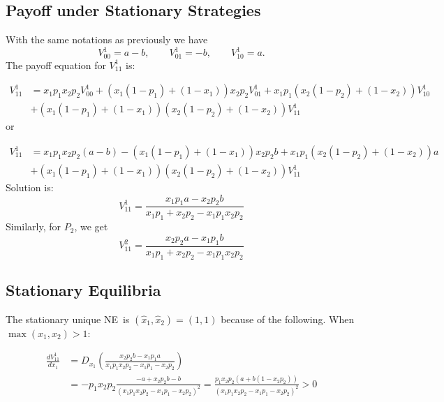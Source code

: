 \documentclass{article}%
\numberwithin{equation}{section}
\begin{document}
\subsection{Payoff under Stationary Strategies}

With the same notations as previously we have%
\[
V_{00}^{1}=a-b,\qquad V_{01}^{1}=-b,\qquad V_{10}^{1}=a.
\]
The payoff equation for $V_{11}^{1}$ is:%

\begin{align*}
V_{11}^{1}  &  =x_{1}p_{1}x_{2}p_{2}V_{00}^{1}+\left(  x_{1}\left(
1-p_{1}\right)  +\left(  1-x_{1}\right)  \right)  x_{2}p_{2}V_{01}^{1}%
+x_{1}p_{1}\left(  x_{2}\left(  1-p_{2}\right)  +\left(  1-x_{2}\right)
\right)  V_{10}^{1}\\
&  +\left(  x_{1}\left(  1-p_{1}\right)  +\left(  1-x_{1}\right)  \right)
\left(  x_{2}\left(  1-p_{2}\right)  +\left(  1-x_{2}\right)  \right)
V_{11}^{1}%
\end{align*}
or%

\begin{align*}
V_{11}^{1}  &  =x_{1}p_{1}x_{2}p_{2}\left(  a-b\right)  -\left(  x_{1}\left(
1-p_{1}\right)  +\left(  1-x_{1}\right)  \right)  x_{2}p_{2}b+x_{1}%
p_{1}\left(  x_{2}\left(  1-p_{2}\right)  +\left(  1-x_{2}\right)  \right)
a\\
&  +\left(  x_{1}\left(  1-p_{1}\right)  +\left(  1-x_{1}\right)  \right)
\left(  x_{2}\left(  1-p_{2}\right)  +\left(  1-x_{2}\right)  \right)
V_{11}^{1}%
\end{align*}
Solution is:
\[
V_{11}^{1}=\frac{x_{1}p_{1}a-x_{2}p_{2}b}{x_{1}p_{1}+x_{2}p_{2}-x_{1}%
p_{1}x_{2}p_{2}}%
\]
Similarly, for $P_{2}$, we get
\[
V_{11}^{2}=\frac{x_{2}p_{2}a-x_{1}p_{1}b}{x_{1}p_{1}+x_{2}p_{2}-x_{1}%
p_{1}x_{2}p_{2}}%
\]


\subsection{Stationary Equilibria}

The stationary unique NE\ is $\left(  \widehat{x}_{1},\widehat{x}_{2}\right)
=\left(  1,1\right)  $ because of the following. When $\max\left(  x_{1}%
,x_{2}\right)  >1$:%

\begin{align*}
\frac{dV_{11}^{1}}{dx_{1}}  &  =D_{x_{1}}\left(  \frac{x_{2}p_{2}b-x_{1}%
p_{1}a}{x_{1}p_{1}x_{2}p_{2}-x_{1}p_{1}-x_{2}p_{2}}\right) \\
&  =\allowbreak-p_{1}x_{2}p_{2}\frac{-a+x_{2}p_{2}b-b}{\left(  x_{1}p_{1}%
x_{2}p_{2}-x_{1}p_{1}-x_{2}p_{2}\right)  ^{2}}=\frac{p_{1}x_{2}p_{2}\left(
a+b\left(  1-x_{2}p_{2}\right)  \right)  }{\left(  x_{1}p_{1}x_{2}p_{2}%
-x_{1}p_{1}-x_{2}p_{2}\right)  ^{2}}>0
\end{align*}
%
\end{document}
